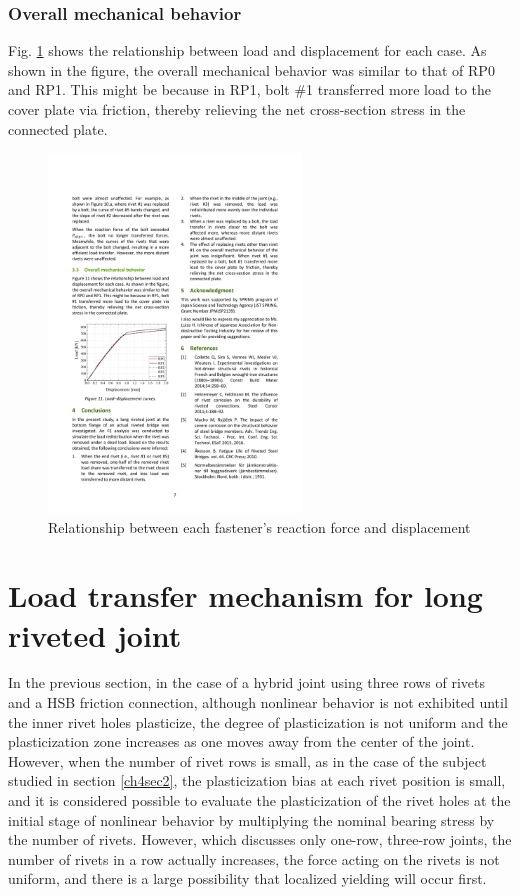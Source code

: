 \subsubsection{Overall mechanical behavior}

Fig. \ref{fig-l11} shows the relationship between load and displacement for each case. As shown in the figure, the overall mechanical behavior was similar to that of RP0 and RP1. This might be because in RP1, bolt \#1 transferred more load to the cover plate via friction, thereby relieving the net cross-section stress in the connected plate.

\begin{figure}[htbp]
    \centering
    \includegraphics[width=0.6\textwidth]{imgs/ch4/fig-l11.pdf}
    \caption{Relationship between each fastener's reaction force and displacement}
    \label{fig-l11}
\end{figure}

\section{Load transfer mechanism for long riveted joint}

In the previous section, in the case of a hybrid joint using three rows of rivets and a \ac{HSB} friction connection, although nonlinear behavior is not exhibited until the inner rivet holes plasticize, the degree of plasticization is not uniform and the plasticization zone increases as one moves away from the center of the joint. However, when the number of rivet rows is small, as in the case of the subject studied in section \ref{ch4sec2}, the plasticization bias at each rivet position is small, and it is considered possible to evaluate the plasticization of the rivet holes at the initial stage of nonlinear behavior by multiplying the nominal bearing stress by the number of rivets. However, which discusses only one-row, three-row joints, the number of rivets in a row actually increases, the force acting on the rivets is not uniform, and there is a large possibility that localized yielding will occur first.

